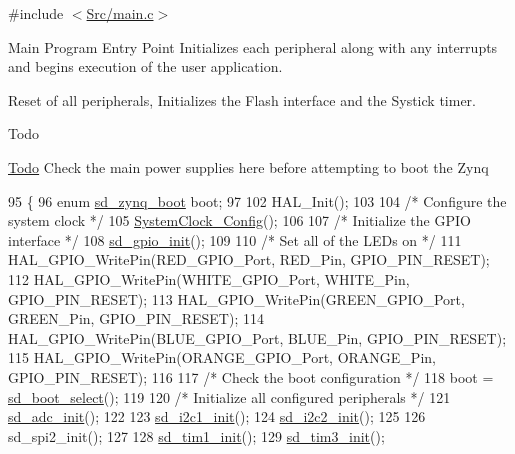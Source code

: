 {\ttfamily \#include $<$\mbox{\hyperlink{main_8c}{Src/main.\+c}}$>$}



Main Program Entry Point Initializes each peripheral along with any interrupts and begins execution of the user application. 

Reset of all peripherals, Initializes the Flash interface and the Systick timer.

\begin{DoxyRefDesc}{Todo}
\item[\mbox{\hyperlink{todo__todo000001}{Todo}}]Check the main power supplies here before attempting to boot the Zynq \end{DoxyRefDesc}

\begin{DoxyCode}
95 \{
96     \textcolor{keyword}{enum} \mbox{\hyperlink{group___s_d___platform_ga06667de95c86bfcdef8bcc8ab13cb2d4}{sd\_zynq\_boot}} boot;
97     
102     HAL\_Init();
103 
104     \textcolor{comment}{/* Configure the system clock */}
105     \mbox{\hyperlink{group___s_d___main_ga70af21c671abfcc773614a9a4f63d920}{SystemClock\_Config}}();
106 
107     \textcolor{comment}{/* Initialize the GPIO interface */}
108     \mbox{\hyperlink{group___s_d___g_p_i_o___functions_ga8e151b8cf065d8de5eb8f4908b18072b}{sd\_gpio\_init}}();
109     
110     \textcolor{comment}{/* Set all of the LEDs on */}
111     HAL\_GPIO\_WritePin(RED\_GPIO\_Port, RED\_Pin, GPIO\_PIN\_RESET);
112     HAL\_GPIO\_WritePin(WHITE\_GPIO\_Port, WHITE\_Pin, GPIO\_PIN\_RESET);
113     HAL\_GPIO\_WritePin(GREEN\_GPIO\_Port, GREEN\_Pin, GPIO\_PIN\_RESET);
114     HAL\_GPIO\_WritePin(BLUE\_GPIO\_Port, BLUE\_Pin, GPIO\_PIN\_RESET);
115     HAL\_GPIO\_WritePin(ORANGE\_GPIO\_Port, ORANGE\_Pin, GPIO\_PIN\_RESET);
116     
117     \textcolor{comment}{/* Check the boot configuration */}
118     boot = \mbox{\hyperlink{group___s_d___platform_ga28381c9d642f66d9a6968ff7406a63d4}{sd\_boot\_select}}();
119   
120     \textcolor{comment}{/* Initialize all configured peripherals */}
121     \mbox{\hyperlink{group___s_d___a_d_c___functions_ga1a0d46dabe915346e428a46b9f943879}{sd\_adc\_init}}();
122 
123     \mbox{\hyperlink{group___s_d___i2_c___functions_ga47b7e9401e2826acc6b03f258dc644a9}{sd\_i2c1\_init}}();
124     \mbox{\hyperlink{group___s_d___i2_c___functions_ga8ae735df0c54e25588a526d9a92d3a69}{sd\_i2c2\_init}}();
125 
126     sd\_spi2\_init();
127     
128     \mbox{\hyperlink{group___s_d___p_w_m___functions_ga60aa52b042f8f0dd0af4b31290239242}{sd\_tim1\_init}}();
129     \mbox{\hyperlink{group___s_d___p_w_m___functions_ga0dd6df2aa5533a54908ab2b4035511e1}{sd\_tim3\_init}}();

\end{DoxyCode}
